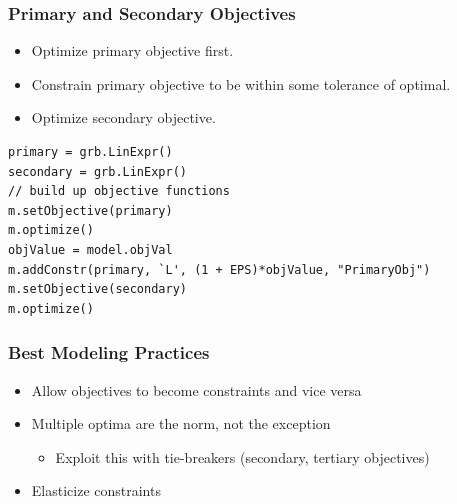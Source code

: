 \documentclass[12pt,handout]{beamer}
\begin{document}
\begin{frame} [containsverbatim]
\frametitle{Primary and Secondary Objectives}
\begin{itemize}
\item Optimize primary objective first.
\item Constrain primary objective to be within some tolerance of optimal.
\item Optimize secondary objective.
\end{itemize}
\small
\begin{verbatim}
primary = grb.LinExpr()
secondary = grb.LinExpr()
// build up objective functions
m.setObjective(primary)
m.optimize()
objValue = model.objVal
m.addConstr(primary, `L', (1 + EPS)*objValue, "PrimaryObj")
m.setObjective(secondary)
m.optimize()
\end{verbatim}
\end{frame}

\begin{frame}
\frametitle{Best Modeling Practices}
\begin{itemize}
\item Allow objectives to become constraints and vice versa
\item Multiple optima are the norm, not the exception
    \begin{itemize}
    \item Exploit this with tie-breakers (secondary, tertiary objectives)
    \end{itemize}
\item Elasticize constraints
\end{itemize}
\end{frame}

\end{document}
